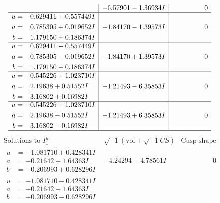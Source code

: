\documentclass[1p]{elsarticle_modified}
\theoremstyle{definition}
\newcommand{\I}{\sqrt{-1}}
\begin{document}
$$\begin{array}{c|c|c}
 & -5.57901 - 1.36934 I & \phantom{-0.000000 } 0 \\ \hline\begin{aligned}
u &= \phantom{-}0.629411 + 0.557449 I \\
a &= \phantom{-}0.785305 + 0.019652 I \\
b &= \phantom{-}1.179150 + 0.186374 I\end{aligned}
 & -1.84170 - 1.39573 I & \phantom{-0.000000 } 0 \\ \hline\begin{aligned}
u &= \phantom{-}0.629411 - 0.557449 I \\
a &= \phantom{-}0.785305 - 0.019652 I \\
b &= \phantom{-}1.179150 - 0.186374 I\end{aligned}
 & -1.84170 + 1.39573 I & \phantom{-0.000000 } 0 \\ \hline\begin{aligned}
u &= -0.545226 + 1.023710 I \\
a &= \phantom{-}2.19638 + 0.51552 I \\
b &= \phantom{-}3.16802 + 0.16982 I\end{aligned}
 & -1.21493 - 6.35853 I & \phantom{-0.000000 } 0 \\ \hline\begin{aligned}
u &= -0.545226 - 1.023710 I \\
a &= \phantom{-}2.19638 - 0.51552 I \\
b &= \phantom{-}3.16802 - 0.16982 I\end{aligned}
 & -1.21493 + 6.35853 I & \phantom{-0.000000 } 0\\
 \hline 
 \end{array}$$\newpage$$\begin{array}{c|c|c}  
\text{Solutions to }I^u_{1}& \I (\text{vol} + \sqrt{-1}CS) & \text{Cusp shape}\\
 \hline 
\begin{aligned}
u &= -1.081710 + 0.428341 I \\
a &= -0.21642 + 1.64363 I \\
b &= -0.206993 + 0.628296 I\end{aligned}
 & -4.24294 + 4.78561 I & \phantom{-0.000000 } 0 \\ \hline\begin{aligned}
u &= -1.081710 - 0.428341 I \\
a &= -0.21642 - 1.64363 I \\
b &= -0.206993 - 0.628296 I\end{aligned}

\end{array}$$
\end{document}
